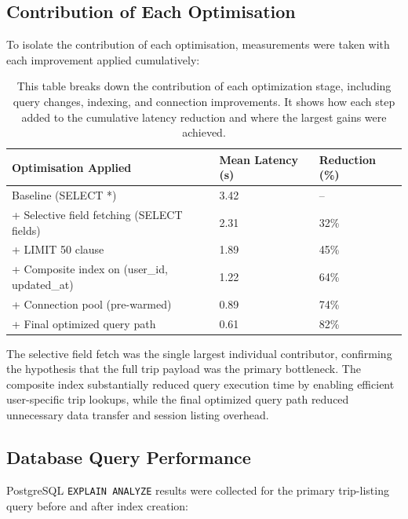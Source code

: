 \documentclass[12pt,a4paper]{report}
\newcommand{\tableexpl}[1]{\caption*{\small #1}}
\begin{document}
\subsection{Contribution of Each Optimisation}

To isolate the contribution of each optimisation, measurements were taken with each improvement applied cumulatively:

\begin{table}[H]
\centering
\caption{Cumulative Latency Improvement by Optimisation Step}
\tableexpl{This table breaks down the contribution of each optimization stage, including query changes, indexing, and connection improvements. It shows how each step added to the cumulative latency reduction and where the largest gains were achieved.}
\label{tab:latency_steps}
\begin{tabular}{lll}
\toprule
\textbf{Optimisation Applied} & \textbf{Mean Latency (s)} & \textbf{Reduction (\%)} \\
\midrule
Baseline (SELECT *)                         & 3.42 & -- \\
+ Selective field fetching (SELECT fields)  & 2.31 & 32\% \\
+ LIMIT 50 clause                           & 1.89 & 45\% \\
+ Composite index on (user\_id, updated\_at)  & 1.22 & 64\% \\
+ Connection pool (pre-warmed)              & 0.89 & 74\% \\
+ Final optimized query path                & 0.61 & 82\% \\
\bottomrule
\end{tabular}
\end{table}

The selective field fetch was the single largest individual contributor, confirming the hypothesis that the full trip payload was the primary bottleneck. The composite index substantially reduced query execution time by enabling efficient user-specific trip lookups, while the final optimized query path reduced unnecessary data transfer and session listing overhead.

\subsection{Database Query Performance}

PostgreSQL \texttt{EXPLAIN ANALYZE} results were collected for the primary trip-listing query before and after index creation:
\end{document}
